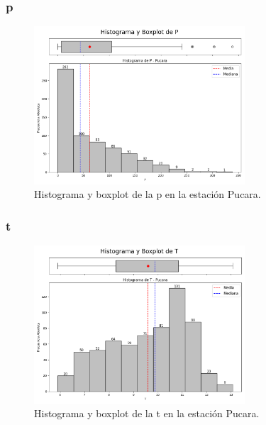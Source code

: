 \subsubsection*{\gls{p} }
\begin{figure}[htbp]
\centering
\includegraphics[width=0.7\textwidth]{resultados/por_estacion_meteorologica/Pucara/P_histograma.png}
\caption{Histograma y boxplot de la \gls{p}  en la estación Pucara.}
\label{fig:pucara_P}
\end{figure}

\subsubsection*{\gls{t} }
\begin{figure}[htbp]
\centering
\includegraphics[width=0.7\textwidth]{resultados/por_estacion_meteorologica/Pucara/T_histograma.png}
\caption{Histograma y boxplot de la \gls{t}  en la estación Pucara.}
\label{fig:pucara_T}
\end{figure}

